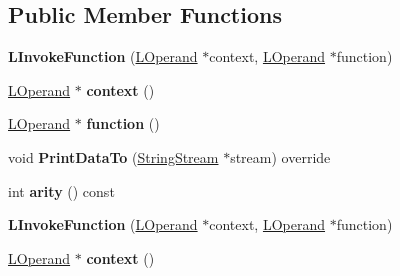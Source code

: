 \subsection*{Public Member Functions}
\begin{DoxyCompactItemize}
\item 
{\bfseries L\+Invoke\+Function} (\hyperlink{classv8_1_1internal_1_1_l_operand}{L\+Operand} $\ast$context, \hyperlink{classv8_1_1internal_1_1_l_operand}{L\+Operand} $\ast$function)\hypertarget{classv8_1_1internal_1_1_l_invoke_function_a5621c666961979a5e2b8040012104584}{}\label{classv8_1_1internal_1_1_l_invoke_function_a5621c666961979a5e2b8040012104584}

\item 
\hyperlink{classv8_1_1internal_1_1_l_operand}{L\+Operand} $\ast$ {\bfseries context} ()\hypertarget{classv8_1_1internal_1_1_l_invoke_function_a135e62542f8310481e4b6da62161aaf9}{}\label{classv8_1_1internal_1_1_l_invoke_function_a135e62542f8310481e4b6da62161aaf9}

\item 
\hyperlink{classv8_1_1internal_1_1_l_operand}{L\+Operand} $\ast$ {\bfseries function} ()\hypertarget{classv8_1_1internal_1_1_l_invoke_function_adef20a27af957203c48c8195cca27ba6}{}\label{classv8_1_1internal_1_1_l_invoke_function_adef20a27af957203c48c8195cca27ba6}

\item 
void {\bfseries Print\+Data\+To} (\hyperlink{classv8_1_1internal_1_1_string_stream}{String\+Stream} $\ast$stream) override\hypertarget{classv8_1_1internal_1_1_l_invoke_function_a3658a4b616314c81dc584d53ed3eeaf0}{}\label{classv8_1_1internal_1_1_l_invoke_function_a3658a4b616314c81dc584d53ed3eeaf0}

\item 
int {\bfseries arity} () const \hypertarget{classv8_1_1internal_1_1_l_invoke_function_ab26485ef4a29427d4dfbaebddced060e}{}\label{classv8_1_1internal_1_1_l_invoke_function_ab26485ef4a29427d4dfbaebddced060e}

\item 
{\bfseries L\+Invoke\+Function} (\hyperlink{classv8_1_1internal_1_1_l_operand}{L\+Operand} $\ast$context, \hyperlink{classv8_1_1internal_1_1_l_operand}{L\+Operand} $\ast$function)\hypertarget{classv8_1_1internal_1_1_l_invoke_function_a5621c666961979a5e2b8040012104584}{}\label{classv8_1_1internal_1_1_l_invoke_function_a5621c666961979a5e2b8040012104584}

\item 
\hyperlink{classv8_1_1internal_1_1_l_operand}{L\+Operand} $\ast$ {\bfseries context} ()\hypertarget{classv8_1_1internal_1_1_l_invoke_function_a135e62542f8310481e4b6da62161aaf9}{}\label{classv8_1_1internal_1_1_l_invoke_function_a135e62542f8310481e4b6da62161aaf9}


\end{DoxyCompactItemize}
